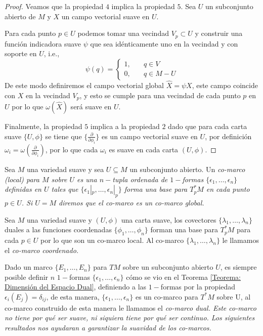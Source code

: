 \begin{proof}
	Veamos que la propiedad $4$ implica la propiedad $5$. Sea $U$ un subconjunto abierto de $M$ y $X$ un campo vectorial suave en $U$.

	Para cada punto $p \in U$ podemos tomar una vecindad $V_p \subset U$ y construir una función indicadora suave $\psi$ que sea idénticamente uno en la vecindad y con soporte en $U$, i.e.,
	\[
		\psi(q) = \begin{cases}
			1, \quad & q \in V     \\
			0, \quad & q \in M - U
		\end{cases}
	\]
	De este modo definiremos el campo vectorial global $\hat{X} = \psi X$, este campo coincide con $X$ en la vecindad $V_p$, y esto se cumple para una vecindad de cada punto $p$ en $U$ por lo que $\omega(\hat{X})$ será suave en $U$.

	Finalmente, la propiedad $5$ implica a la propiedad $2$ dado que para cada carta suave $\{U,\phi\}$ se tiene que $\{\frac{\partial}{\partial \phi_i}\}$ es un campo vectorial suave en $U$, por definición $\omega_i = \omega(\frac{\partial}{\partial \phi_i})$, por lo que cada $\omega_i$ es suave en cada carta $(U,\phi)$.
\end{proof}

\begin{definition}
	Sea $M$ una variedad suave y sea $U \subseteq M$ un subconjunto abierto. Un \it{co-marco (local) para $M$ sobre $U$} es una $n-$tupla ordenada de $1-$formas $\{\epsilon_1, \ldots, \epsilon_n\}$ definidas en $U$ tales que $\{\epsilon_1|_p, \ldots, \epsilon_n|_p\}$ forma una base para $T_{p}^{*}M$ en cada punto $p \in U$. Si $U = M$ diremos que el co-marco es un \it{co-marco global}.
\end{definition}

\begin{example}
	Sea $M$ una variedad suave y $(U,\phi)$ una carta suave, los covectores $\{\lambda_1, \ldots, \lambda_n\}$ duales a las funciones coordenadas $\{\phi_1, \ldots, \phi_n\}$ forman una base para $T_p^* M$ para cada $p \in U$ por lo que son un co-marco local. Al co-marco $\{\lambda_1, \ldots, \lambda_n\}$ le llamamos el \it{co-marco coordenado}.
\end{example}

Dado un marco $\{E_1, \ldots, E_n\}$ para $TM$ sobre un subconjunto abierto $U$, es siempre posible definir $n$ $1-$formas $\{\epsilon_1, \ldots, \epsilon_n\}$ cómo se vio en el Teorema \ref{Teorema: Dimensión del Espacio Dual}, definiendo a las $1-$formas por la propiedad $\epsilon_i(E_j) = \delta_{ij}$, de esta manera, $\{\epsilon_1,\ldots,\epsilon_n\}$ es un co-marco para $T^*M$ sobre U, al co-marco construido de esta manera le llamamos el \it{co-marco dual}. Este co-marco no tiene por qué ser suave, ni siquiera tiene por qué ser continuo. Los siguientes resultados nos ayudaran a garantizar la suavidad de los co-marcos.

